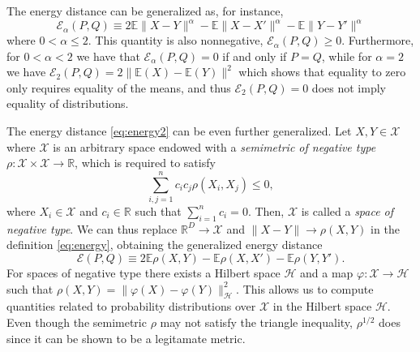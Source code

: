 \documentclass[aps,preprint,nofootinbib,floatfix]{revtex4-1}
\newcommand\Energy{\mathcal{E}}
\newcommand\E{\mathbb{E}}
\begin{document}
The energy distance can be generalized as, for instance,
\begin{equation}
\label{eq:energy2}
\Energy_\alpha(P, Q) \equiv 
2 \E \| X - Y\|^{\alpha} - \E \| X - X' \|^{\alpha} - 
\E \| Y - Y' \|^{\alpha}
\end{equation}
where $0<\alpha\le 2$. This quantity is also nonnegative,
$\Energy_\alpha(P,Q) \ge 0$. Furthermore, for $0<\alpha<2$ we have that
$\Energy_\alpha(P,Q) = 0$ if and only if $P=Q$, while for $\alpha=2$ 
we have $\Energy_2(P,Q) = 2\| \E(X) - \E(Y) \|^2$ which shows that
equality to zero only requires
equality of the means, and thus $\Energy_2(P,Q)=0$ does 
not imply equality of distributions.

The energy distance \eqref{eq:energy2} can be even further generalized.
Let $X, Y \in \mathcal{X}$  where $\mathcal{X}$ is an arbitrary space endowed
with a \emph{semimetric of negative type}
$\rho: \mathcal{X}\times\mathcal{X} \to \mathbb{R}$, which is required
to satisfy
\begin{equation}
\label{eq:negative_type}
\sum_{i,j=1}^n c_i c_j \rho(X_i, X_j) \le 0,
\end{equation}
where $X_i \in \mathcal{X}$ and $c_i \in \mathbb{R}$ such that
$\sum_{i=1}^n c_i = 0$. Then, $\mathcal{X}$ is called a \emph{space of
negative type}.
We can thus replace $\mathbb{R}^D \to \mathcal{X}$ and 
$\| X - Y \| \to \rho(X , Y)$ in the definition \eqref{eq:energy}, obtaining
the generalized energy distance
\begin{equation}
\label{eq:energy3}
\Energy(P, Q) \equiv 2 \E \rho(X,Y) - \E \rho(X, X') - \E \rho(Y,Y').
\end{equation}
For spaces of negative type there exists a Hilbert space $\mathcal{H}$ and
a map $\varphi: \mathcal{X} \to
\mathcal{H}$ such that
$\rho(X, Y) = \| \varphi(X) - \varphi(Y) \|_{\mathcal{H}}^2$. This
allows us to compute quantities related to probability distributions over
$\mathcal{X}$ in the Hilbert space $\mathcal{H}$.
Even though the semimetric 
$\rho$ may not satisfy the triangle inequality, 
$\rho^{1/2}$ does since it can be shown to be a legitamate metric. 
\end{document}
